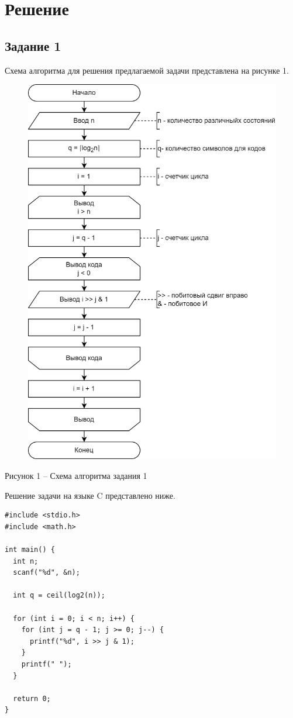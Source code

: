 \documentclass[a4paper,14pt]{extarticle}
\begin{document}
  \newpage
  \section*{Решение}
  \subsection*{Задание 1}
  Схема алгоритма для решения предлагаемой задачи представлена на рисунке 1.
  \begin{figure}[h]
    \centering
    \includegraphics[width=0.6\linewidth]{schemes/s-1}
  \end{figure}
  \begin{center}
    Рисунок 1 – Схема алгоритма задания 1
  \end{center}

  \pagebreak
  Решение задачи на языке C представлено ниже.
  \begin{lstlisting}[tabsize=2,basicstyle=\ttfamily]
#include <stdio.h>
#include <math.h>

int main() {
  int n;
  scanf("%d", &n);
  
  int q = ceil(log2(n));
  
  for (int i = 0; i < n; i++) {
    for (int j = q - 1; j >= 0; j--) {
      printf("%d", i >> j & 1);
    }
    printf(" ");
  }
  
  return 0;
}
  \end{lstlisting}
\end{document}
